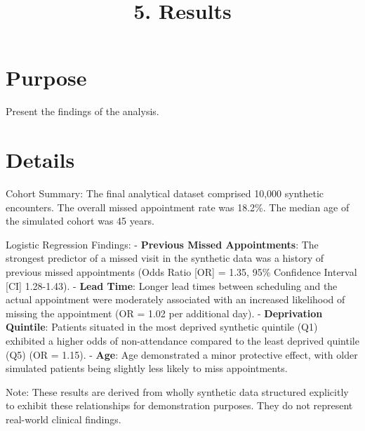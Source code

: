 \documentclass[
]{report}
\title{5. Results}
\author{}
\date{}
\renewcommand*\contentsname{Table of contents}
\newcommand\contentsname{Table of contents}
\begin{document}
\maketitle

\renewcommand*\contentsname{Table of contents}
{
\hypersetup{linkcolor=}
\setcounter{tocdepth}{2}
\tableofcontents
}

\chapter{Purpose}\label{purpose}

Present the findings of the analysis.

\chapter{Details}\label{details}

Cohort Summary: The final analytical dataset comprised 10,000 synthetic
encounters. The overall missed appointment rate was 18.2\%. The median
age of the simulated cohort was 45 years.

Logistic Regression Findings: - \textbf{Previous Missed Appointments}:
The strongest predictor of a missed visit in the synthetic data was a
history of previous missed appointments (Odds Ratio {[}OR{]} = 1.35,
95\% Confidence Interval {[}CI{]} 1.28-1.43). - \textbf{Lead Time}:
Longer lead times between scheduling and the actual appointment were
moderately associated with an increased likelihood of missing the
appointment (OR = 1.02 per additional day). - \textbf{Deprivation
Quintile}: Patients situated in the most deprived synthetic quintile
(Q1) exhibited a higher odds of non-attendance compared to the least
deprived quintile (Q5) (OR = 1.15). - \textbf{Age}: Age demonstrated a
minor protective effect, with older simulated patients being slightly
less likely to miss appointments.

\begin{tcolorbox}[enhanced jigsaw, opacitybacktitle=0.6, opacityback=0, toptitle=1mm, titlerule=0mm, leftrule=.75mm, colbacktitle=quarto-callout-warning-color!10!white, left=2mm, breakable, coltitle=black, title=\textcolor{quarto-callout-warning-color}{\faExclamationTriangle}\hspace{0.5em}{Warning}, arc=.35mm, bottomtitle=1mm, rightrule=.15mm, toprule=.15mm, bottomrule=.15mm, colback=white, colframe=quarto-callout-warning-color-frame]

Note: These results are derived from wholly synthetic data structured
explicitly to exhibit these relationships for demonstration purposes.
They do not represent real-world clinical findings.

\end{tcolorbox}
\end{document}
